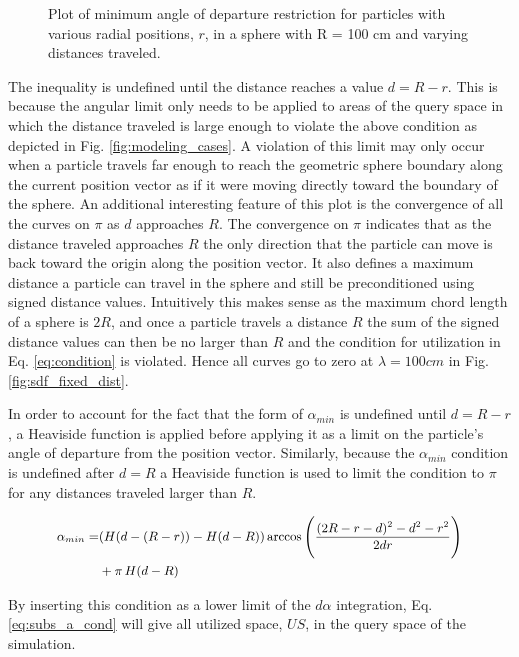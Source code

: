 \begin{figure}
\centering
{\textwidth}
\caption{Plot of minimum angle of departure restriction for particles with
various radial positions, $r$, in a sphere with R = 100 cm and varying distances traveled.}
\end{figure}

The inequality is undefined until the distance reaches a value $d = R- r$. This
is because the angular limit only needs to be applied to areas of the query
space in which the distance traveled is large enough to violate the above
condition as depicted in Fig. \ref{fig:modeling_cases}. A violation of this
limit may only occur when a particle travels far enough to reach the geometric
sphere boundary along the current position vector as if it were moving directly
toward the boundary of the sphere. An additional interesting feature of this
plot is the convergence of all the curves on $\pi$ as $d$ approaches $R$. The
convergence on $\pi$ indicates that as the distance traveled approaches $R$ the
only direction that the particle can move is back toward the origin along the
position vector. It also defines a maximum distance a particle can travel in the
sphere and still be preconditioned using signed distance values. Intuitively
this makes sense as the maximum chord length of a sphere is $2R$, and once a
particle travels a distance $R$ the sum of the signed distance values can then
be no larger than $R$ and the condition for utilization in Eq. \ref{eq:condition} is
violated. Hence all curves go to zero at $\lambda = 100 cm$ in
Fig. \ref{fig:sdf_fixed_dist}.

In order to account for the fact that the form of $\alpha_{min}$ is undefined
until $d = R-r$, a Heaviside function is applied before applying it as a limit
on the particle's angle of departure from the position vector. Similarly,
because the $\alpha_{min}$ condition is undefined after $d=R$ a Heaviside
function is used to limit the condition to $\pi$ for any distances traveled
larger than $R$.

\begin{equation}
  \small
  \begin{split}
  \alpha_{min} =& (H(d-(R-r))-H(d-R)) \arccos\Bigg ( \frac{(2R-r-d)^2-d^2-r^2}{2 d r} \Bigg ) \\
  &+ \pi \, H(d-R)
  \end{split}
\end{equation}


By inserting this condition as a lower limit of the $d\alpha$ integration,
Eq. \ref{eq:subs_a_cond} will give all utilized space, $US$, in the query space
of the simulation.

